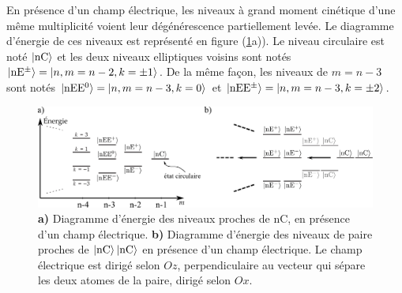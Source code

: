 En présence d'un champ électrique, les niveaux à grand moment cinétique d'une même multiplicité voient leur dégénérescence partiellement levée.
Le diagramme d'énergie de ces niveaux est représenté en figure (\ref{fig:ener_StarknC_nCnC}a)).
Le niveau circulaire est noté $\ket{\mathrm{nC}}$ et les deux niveaux \og elliptiques \fg{} voisins sont notés $\ket{\mathrm{nE^{\pm}}} = \ket{n,m=n-2,k=\pm1}$.
De la même façon, les niveaux de $m=n-3$ sont notés $\ket{\mathrm{nEE^0}} = \ket{n,m=n-3,k=0}$ et $\ket{\mathrm{nEE^{\pm}}} = \ket{n,m=n-3,k=\pm 2}$.
%
\begin{figure}[!h]
\centering
\includegraphics[width=\linewidth]{figures/circsim/diagram_nC_nCnC}
\caption[Diagammre d'énergie des niveaux proches du $\mathrm{50C}$]{
\textbf{a)} Diagramme d'énergie des niveaux proches de $\mathrm{nC}$, en présence d'un champ électrique.
\textbf{b)} Diagramme d'énergie des niveaux de paire proches de $\ket{\mathrm{nC}}\ket{\mathrm{nC}}$ en présence d'un champ électrique.
Le champ électrique est dirigé selon $Oz$, perpendiculaire au vecteur qui sépare les deux atomes de la paire,  dirigé selon $Ox$.
}
\label{fig:ener_StarknC_nCnC}
\end{figure}


